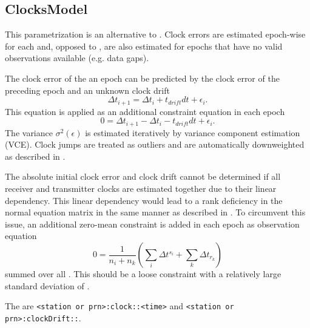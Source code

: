 \subsection{ClocksModel}\label{gnssParametrizationType:clocksModel}
This parametrization is an alternative to .
Clock errors are estimated epoch-wise for each 
and, opposed to , are also estimated for epochs
that have no valid observations available (e.g. data gaps).

The clock error of the an epoch can be predicted by the clock error
of the preceding epoch and an unknown clock drift
\begin{equation}
  \Delta t_{i+1} = \Delta t_{i} + t_{drift} dt + \epsilon_i.
\end{equation}
This equation is applied as an additional constraint equation in each epoch
\begin{equation}
  0 = \Delta t_{i+1} - \Delta t_{i} - t_{drift} dt + \epsilon_i.
\end{equation}
The variance $\sigma^2(\epsilon)$ is estimated iteratively by variance component estimation (VCE).
Clock jumps are treated as outliers and are automatically downweighted as described in
.

The absolute initial clock error and clock drift cannot be determined if all receiver
and transmitter clocks are estimated together due to their linear dependency.
This linear dependency would lead to a rank deficiency in the normal equation matrix in the same
manner as described in .
To circumvent this issue, an additional zero-mean constraint is added in each epoch
as observation equation
\begin{equation}
  0 = \frac{1}{n_i + n_k} (\sum_i \Delta t^{s_i} + \sum_k \Delta t_{r_k})
\end{equation}
summed over all .
This should be a loose constraint with a relatively large standard deviation of .

The  are \verb|<station or prn>:clock::<time>|
and \verb|<station or prn>:clockDrift::|.


